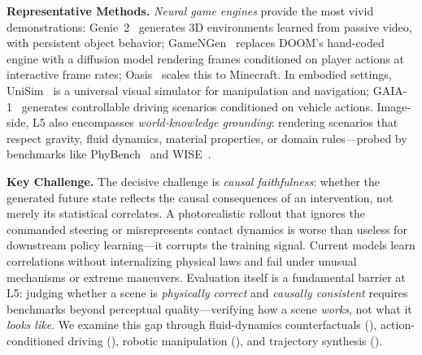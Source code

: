 \textbf{Representative Methods.} \emph{Neural game engines} provide the most vivid demonstrations: Genie~2~\citep{parker2024genie2} generates 3D environments learned from passive video, with persistent object behavior; GameNGen~\citep{valevski2024gamenngen} replaces DOOM's hand-coded engine with a diffusion model rendering frames conditioned on player actions at interactive frame rates; Oasis~\citep{oasis2024} scales this to Minecraft. In embodied settings, UniSim~\citep{yang2024unisim} is a universal visual simulator for manipulation and navigation; GAIA-1~\citep{hu2024gaia1} generates controllable driving scenarios conditioned on vehicle actions. Image-side, L5 also encompasses \emph{world-knowledge grounding}: rendering scenarios that respect gravity, fluid dynamics, material properties, or domain rules---probed by benchmarks like PhyBench~\citep{meng2024phybench} and WISE~\citep{niu2025wise}.

\textbf{Key Challenge.} The decisive challenge is \emph{causal faithfulness}: whether the generated future state reflects the causal consequences of an intervention, not merely its statistical correlates. A photorealistic rollout that ignores the commanded steering or misrepresents contact dynamics is worse than useless for downstream policy learning---it corrupts the training signal. Current models learn correlations without internalizing physical laws and fail under unusual mechanisms or extreme maneuvers. Evaluation itself is a fundamental barrier at L5: judging whether a scene is \emph{physically correct} and \emph{causally consistent} requires benchmarks beyond perceptual quality---verifying how a scene \emph{works}, not what it \emph{looks like}. We examine this gap through fluid-dynamics counterfactuals (), action-conditioned driving (), robotic manipulation (), and trajectory synthesis ().



